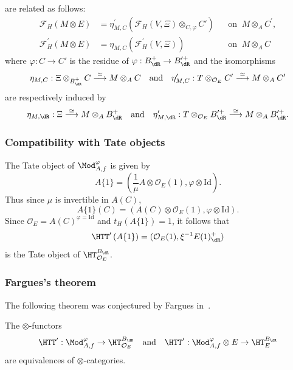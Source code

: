 are related as follows:
\[
\begin{aligned}
\mathcal{F}_{H}(M\otimes E) & = \eta_{M,C}^{\prime}\left(\mathcal{F}_{H}(V,\Xi)\otimes_{C,\varphi}C'\right) && \text{on}\;\; M\otimes_{A}C^{\prime},\\
\mathcal{F}_{H}^{\prime}(M\otimes E) & = \eta_{M,C}\left(\mathcal{F}_{H}^{\prime}(V,\Xi)\right) && \text{on}\;\; M\otimes_{A}C
\end{aligned}
\]
where $\varphi:C\rightarrow C'$ is the residue of $\varphi:B_{\dR}^{+}\rightarrow B_{\dR}^{\prime+}$ and the isomorphisms
\[
\eta_{M,C}:\Xi\otimes_{B_{\dR}^{+}}C\stackrel{\simeq}{\longrightarrow}M\otimes_{A}C\quad\text{and}\quad\eta_{M,C}^{\prime}:T\otimes_{\mathcal{O}_{E}}C'\stackrel{\simeq}{\longrightarrow}M\otimes_{A}C'
\]
are respectively induced by
\[
\eta_{M,\dR}:\Xi\stackrel{\simeq}{\longrightarrow}M\otimes_{A}B_{\dR}^{+}\quad\text{and}\quad\eta_{M,\dR}^{\prime}:T\otimes_{\mathcal{O}_{E}}B_{\dR}^{\prime+}\stackrel{\simeq}{\longrightarrow}M\otimes_{A}B_{\dR}^{\prime+}.
\]


\subsubsection{Compatibility with Tate objects}

The Tate object of $\Mod_{A,f}^{\varphi}$ is given by
\[
A\{1\}=\left({\frac{1}{\mu}}A\otimes\mathcal{O}_{E}(1),\varphi\otimes\mathrm{Id}\right).
\]
Thus since $\mu$ is invertible in $A(C)$,
\[
A\{1\}(C)=\left(A(C)\otimes\mathcal{O}_{E}(1),\varphi\otimes\mathrm{Id}\right).
\]
Since $\mathcal{O}_{E}=A(C)^{\varphi=\mathrm{Id}}$ and $t_{H}(A\{1\})=1$, it follows that
\[
\HTT^{\prime}\left(A\{1\}\right)=(\mathcal{O}_{E}(1),\xi^{-1}E(1)_{\dR}^{+})
\]
is the Tate object of $\HT_{\mathcal{O}_{E}}^{B_{\dR}}$.

\subsubsection{Fargues's theorem}\label{subsec:Fargue's-theorem}

The following theorem was conjectured by Fargues in~\cite{Fa15}.

\begin{theo}\label{thm:FarguesScholze}
The $\otimes$-functors
\[
\HTT^{\prime}:\Mod_{A,f}^{\varphi}\rightarrow\HT_{\mathcal{O}_{E}}^{B_{\dR}}\quad\text{and}\quad\HTT^{\prime}:\Mod_{A,f}^{\varphi}\otimes E\rightarrow\HT_{E}^{B_{\dR}}
\]
are equivalences of $\otimes$-categories.
\end{theo}


